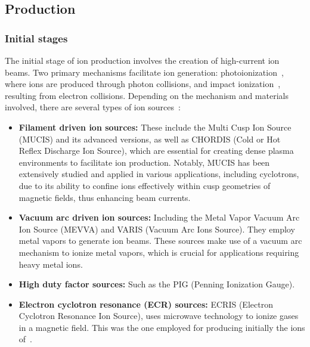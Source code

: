 \subsection{Production}\label{subsec:chap2:production}
\subsubsection{Initial stages}\label{subsubsec:chap2:sources}
The initial stage of ion production involves the creation of high-current ion beams. Two primary mechanisms facilitate ion generation: photoionization~\cite{Photoionization}, where ions are produced through photon collisions, and impact ionization~\cite{impactionization}, resulting from electron collisions. Depending on the mechanism and materials involved, there are several types of ion sources~\cite{ionsourcesGSI}:

\begin{itemize}
    \item \textbf{Filament driven ion sources:} These include the Multi Cusp Ion Source (\textsc{MUCIS}) and its advanced versions, as well as \textsc{CHORDIS} (Cold or Hot Reflex Discharge Ion Source), which are essential for creating dense plasma environments to facilitate ion production. Notably, \textsc{MUCIS} has been extensively studied and applied in various applications, including cyclotrons, due to its ability to confine ions effectively within cusp geometries of magnetic fields, thus enhancing beam currents.
    \item \textbf{Vacuum arc driven ion sources:} Including the Metal Vapor Vacuum Arc Ion Source (\textsc{MEVVA}) and \textsc{VARIS} (Vacuum Arc Ions Source). They employ metal vapors to generate ion beams. These sources make use of a vacuum arc mechanism to ionize metal vapors, which is crucial for applications requiring heavy metal ions.
    \item \textbf{High duty factor sources:} Such as the \textsc{PIG} (Penning Ionization Gauge).
    \item \textbf{Electron cyclotron resonance (ECR) sources:} \textsc{ECRIS} (Electron Cyclotron Resonance Ion Source), uses microwave technology to ionize gases in a magnetic field. This was the one employed for producing initially the ions of \,.
\end{itemize}

